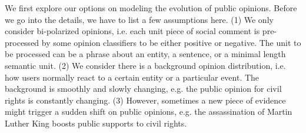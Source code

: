 \documentclass[runningheads]{llncs}
\begin{document}
We first explore our options on modeling the evolution of public opinions. Before we go into the details, we have to list a few assumptions here. (1) We only consider bi-polarized opinions, i.e. each unit piece of social comment is pre-processed by some opinion classifiers to be either positive or negative. The unit to be processed can be a phrase about an entity, a sentence, or a minimal length semantic unit. (2) We consider there is a background opinion distribution, i.e. how users normally react to a certain entity or a particular event. The background is smoothly and slowly changing, e.g. the public opinion for civil rights is constantly changing. (3) However, sometimes a new piece of evidence might trigger a sudden shift on public opinions, e.g. the assassination of Martin Luther King boosts public  supports to civil rights.  
\end{document}
